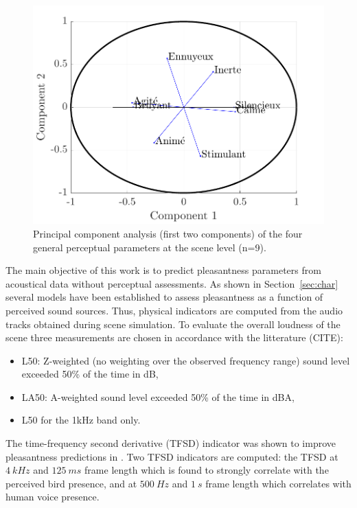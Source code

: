 \documentclass{article}
\begin{document}
\begin{sloppy}
\begin{figure}[t]
  \centering
  \centerline{\includegraphics[width=\columnwidth]{pca.pdf}}
  \caption{Principal component analysis (first two components) of the four general perceptual parameters at the scene level (n=9). }
  \label{fig:pca}
\end{figure}

The main objective of this work is to predict pleasantness parameters from acoustical data without perceptual assessments. As shown in Section~\ref{sec:char} several models have been established to assess pleasantness as a function of perceived sound sources. Thus, physical indicators are computed from the audio tracks obtained during scene simulation. To evaluate the overall loudness of the scene three measurements are chosen in accordance with the litterature (CITE):
\begin{itemize}
\item L50: Z-weighted (no weighting over the observed frequency range) sound level exceeded 50\% of the time in dB,
\item LA50: A-weighted sound level exceeded 50\% of the time in dBA,
\item L50 for the 1kHz band only.
\end{itemize}
The time-frequency second derivative (TFSD) indicator was shown to improve pleasantness predictions in \cite{aumond}. Two TFSD indicators are computed: the TFSD at $4~kHz$ and $125~ms$ frame length which is found to strongly correlate with the perceived bird presence, and at $500~Hz$ and $1~s$ frame length which correlates with human voice presence.


\end{sloppy}
\end{document}
